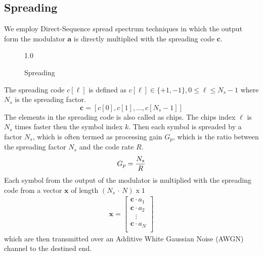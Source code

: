 \subsection{Spreading}
We employ Direct-Sequence spread spectrum techniques in which the output form the modulator $\mathrm{\mathbf{a}}$ is directly multiplied with the spreading code $\mathrm{\mathbf{c}}$.
\begin{figure}[htb]
\centerline{  {1.0} }
\caption{Spreading}
\end{figure}
The spreading code $c[\ell]$ is defined as $c[\ell] \in \{+1,-1\}, 0 \leq \ell \leq N_s-1$ where $N_s$ is the spreading factor.
\begin{equation}
\mathrm{\mathbf{c}}=[c[0],c[1],\dots,c[N_s-1]]
\end{equation}
The elements in the spreading code is also called as chips. The chips index $\ell$ is $N_s$ times faster then the symbol index $k$. Then each symbol is spreaded by a factor $N_s$, which is often termed as processing gain $G_p$, which is the ratio between the spreading factor $N_s$ and the code rate $R$.
\begin{equation}
G_p=\frac{\hbox{$N_s$}}{\hbox{$R$}}
\end{equation}
Each symbol from the output of the modulator is multiplied with the spreading code from a vector $\mathrm{\mathbf{x}}$ of length $(N_s\,\cdot\,N)\;\mathrm{x}\;1$
\begin{eqnarray}
\mathrm{\mathbf{x}} = \left[
\begin{array}{lll}
\mathrm{\mathbf{c}}\cdot a_1 \\
\mathrm{\mathbf{c}}\cdot a_2 \\
\;\;\,\vdots \\
\mathrm{\mathbf{c}} \cdot a_N \\
\end{array}
\right]
\end{eqnarray}
which are then transmitted over an Additive White Gaussian Noise (AWGN) channel to the destined end. \\ \\
